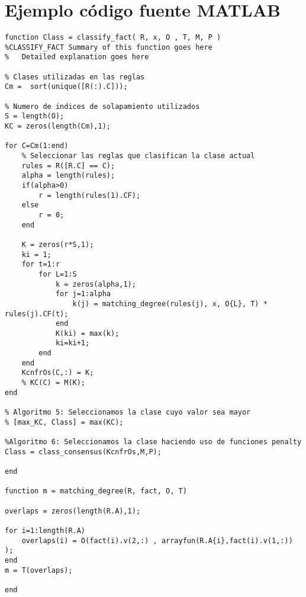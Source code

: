 \chapter{Ejemplo código fuente MATLAB}
\label{cha:ejemplo-codigo-fuente-matlab}
\lstset{language=MATLAB,basicstyle=\ttfamily,numbers=left}
\begin{lstlisting}
function Class = classify_fact( R, x, O , T, M, P )
%CLASSIFY_FACT Summary of this function goes here
%   Detailed explanation goes here

% Clases utilizadas en las reglas
Cm =  sort(unique([R(:).C]));

% Numero de indices de solapamiento utilizados
S = length(O);
KC = zeros(length(Cm),1);

for C=Cm(1:end)
    % Seleccionar las reglas que clasifican la clase actual
    rules = R([R.C] == C);
    alpha = length(rules);
    if(alpha>0)
        r = length(rules(1).CF);
    else
        r = 0;
    end
    
    K = zeros(r*S,1);
    ki = 1;
    for t=1:r
        for L=1:S
            k = zeros(alpha,1);
            for j=1:alpha
                k(j) = matching_degree(rules(j), x, O{L}, T) * rules(j).CF(t);
            end
            K(ki) = max(k);
            ki=ki+1;
        end
    end
    KcnfrOs(C,:) = K; 
    % KC(C) = M(K);
end

% Algoritmo 5: Seleccionamos la clase cuyo valor sea mayor
% [max_KC, Class] = max(KC);

%Algoritmo 6: Seleccionamos la clase haciendo uso de funciones penalty
Class = class_consensus(KcnfrOs,M,P);

end

function m = matching_degree(R, fact, O, T)

overlaps = zeros(length(R.A),1);

for i=1:length(R.A)
    overlaps(i) = O(fact(i).v(2,:) , arrayfun(R.A{i},fact(i).v(1,:)) );
end
m = T(overlaps);

end
\end{lstlisting}